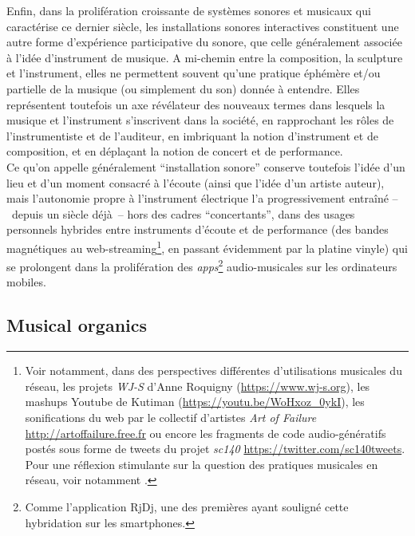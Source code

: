 \noindent Enfin, dans la prolifération croissante de systèmes sonores et musicaux qui caractérise ce dernier siècle, les installations sonores interactives constituent une autre forme d'expérience participative du sonore, que celle généralement associée à l'idée d'instrument de musique. A mi-chemin entre la composition, la sculpture et l'instrument, elles ne permettent souvent qu'une pratique éphémère et/ou partielle de la musique (ou simplement du son) donnée à entendre. Elles représentent toutefois un axe révélateur des nouveaux termes dans lesquels la musique et l'instrument s'inscrivent dans la société, en rapprochant les rôles de l'instrumentiste et de l'auditeur, en imbriquant la notion d'instrument et de composition, et en déplaçant la notion de concert et de performance.\\
\indent Ce qu'on appelle généralement ``installation sonore'' conserve toutefois l'idée d'un lieu et d'un moment consacré à l'écoute (ainsi que l'idée d'un artiste auteur), mais l'autonomie propre à l'instrument électrique l'a progressivement entraîné --~depuis un siècle déjà~-- hors des cadres ``concertants'', dans des usages personnels hybrides entre instruments d'écoute et de performance (des bandes magnétiques au web-streaming\footnote{Voir notamment, dans des perspectives différentes d'utilisations musicales du réseau, les projets \textit{WJ-S} d'Anne Roquigny (\url{https://www.wj-s.org}), les mashups Youtube de Kutiman (\url{https://youtu.be/WoHxoz_0ykI}), les sonifications du web par le collectif d'artistes \textit{Art of Failure} \url{http://artoffailure.free.fr} ou encore les fragments de code audio-génératifs postés sous forme de tweets du projet \textit{sc140} \url{https://twitter.com/sc140tweets}. Pour une réflexion stimulante sur la question des pratiques musicales en réseau, voir notamment \cite{joy_epoque_2009}.}, en passant évidemment par la platine vinyle) qui se prolongent dans la prolifération des \textit{apps}\footnote{Comme l'application RjDj, une des premières ayant souligné cette hybridation sur les smartphones.} audio-musicales sur les ordinateurs mobiles.
\subsection{Musical organics}
\label{sec:ephemerality:musical-organics}


